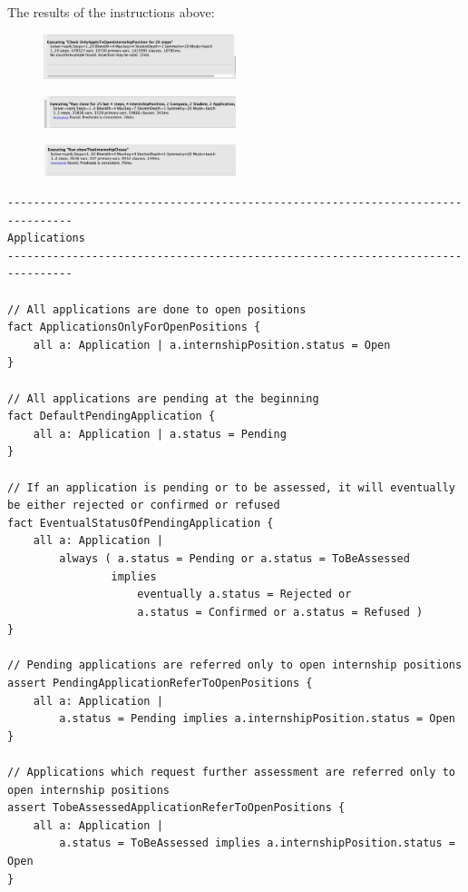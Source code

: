 The results of the instructions above:
\begin{figure}[h!]
    \centering\includegraphics[width=0.5\textwidth]{RASD/Images/Alloy/checkOnlyApplyToOpenInternshipPosition.png}
    \label{fig:checkOnlyApplyToOpenInternshipPosition}
\end{figure}
\begin{figure}[h!]
    \centering\includegraphics[width=0.5\textwidth]{RASD/Images/Alloy/predclose.png}
    \label{fig:predclose}
\end{figure}
\begin{figure}[h!]
    \centering\includegraphics[width=0.5\textwidth]{RASD/Images/Alloy/predshowThatInternshipCloses.png}
    \label{fig:predshowThatInternshipCloses}
\end{figure}
\newpage
\begin{verbatim}
--------------------------------------------------------------------------------
Applications
--------------------------------------------------------------------------------

// All applications are done to open positions
fact ApplicationsOnlyForOpenPositions {
    all a: Application | a.internshipPosition.status = Open
}

// All applications are pending at the beginning
fact DefaultPendingApplication {
    all a: Application | a.status = Pending
}

// If an application is pending or to be assessed, it will eventually be either rejected or confirmed or refused
fact EventualStatusOfPendingApplication {
    all a: Application | 
        always ( a.status = Pending or a.status = ToBeAssessed
                implies 
                    eventually a.status = Rejected or 
                    a.status = Confirmed or a.status = Refused )
}

// Pending applications are referred only to open internship positions
assert PendingApplicationReferToOpenPositions {
    all a: Application | 
        a.status = Pending implies a.internshipPosition.status = Open
}

// Applications which request further assessment are referred only to open internship positions
assert TobeAssessedApplicationReferToOpenPositions {
    all a: Application | 
        a.status = ToBeAssessed implies a.internshipPosition.status = Open
}
\end{verbatim}
